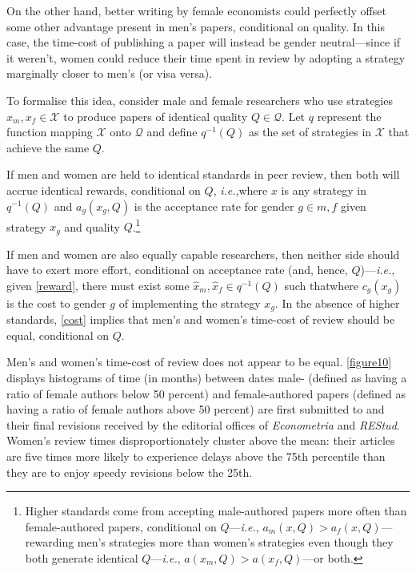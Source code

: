 On the other hand, better writing by female economists could perfectly offset some other advantage present in men's papers, conditional on quality. In this case, the time-cost of publishing a paper will instead be gender neutral---since if it weren't, women could reduce their time spent in review by adopting a strategy marginally closer to men's (or visa versa).

To formalise this idea, consider male and female researchers who use strategies $x_m,x_f\in\mathcal X$ to produce papers of identical quality $Q\in\mathcal Q$. Let $q$ represent the function mapping $\mathcal X$ onto $\mathcal Q$ and define $q^{-1}(Q)$ as the set of strategies in $\mathcal X$ that achieve the same $Q$.

If men and women are held to identical standards in peer review, then both will accrue identical rewards, conditional on $Q$, \emph{i.e.},where $x$ is any strategy in $q^{-1}(Q)$ and $a_g(x_g,Q)$ is the acceptance rate for gender $g\in{m,f}$ given strategy $x_g$ and quality $Q$.\footnote{Higher standards come from accepting male-authored papers more often than female-authored papers, conditional on $Q$---\emph{i.e.}, $a_m(x,Q)>a_f(x,Q)$---rewarding men's strategies more than women's strategies even though they both generate identical $Q$---\emph{i.e.}, $a(x_m,Q)>a(x_f,Q)$---or both.}

If men and women are also equally capable researchers, then neither side should have to exert more effort, conditional on acceptance rate (and, hence, $Q$)---\emph{i.e.}, given \autoref{reward}, there must exist some $\hat x_m,\hat x_f\in q^{-1}(Q)$ such thatwhere $c_g(x_g)$ is the cost to gender $g$ of implementing the strategy $x_g$. In the absence of higher standards, \autoref{cost} implies that men's and women's time-cost of review should be equal, conditional on $Q$.

Men's and women's time-cost of review does not appear to be equal. \autoref{figure10} displays histograms of time (in months) between dates male- (defined as having a ratio of female authors below 50 percent) and female-authored papers (defined as having a ratio of female authors above 50 percent) are first submitted to and their final revisions received by the editorial offices of \emph{Econometria} and \emph{REStud}. Women's review times disproportionately cluster above the mean: their articles are five times more likely to experience delays above the 75th percentile than they are to enjoy speedy revisions below the 25th.

